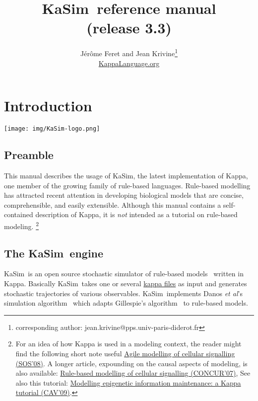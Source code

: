 \documentclass[11pt]{book}
\title{KaSim\version~reference manual\\ \small (release 3.3)}
\author{J\'er\^ome Feret and Jean Krivine\thanks{corresponding author: jean.krivine@pps.univ-paris-diderot.fr} \\\url{KappaLanguage.org}}
\date{}
\def\KaSim{\textsf{KaSim}}
\begin{document}
\maketitle


\tableofcontents
\listoftables

\chapter{Introduction}
\begin{center}\texttt{[image: img/KaSim-logo.png]}\end{center}

\section{Preamble}
This manual describes the usage of \KaSim, the latest implementation of Kappa, one member of the growing family of rule-based languages. Rule-based modelling has attracted recent attention in developing biological models that are concise, comprehensible, and easily extensible. 
Although this manual contains a self-contained description of Kappa, it is \emph{not} intended as a tutorial on rule-based modeling.%
%
\footnote{For an idea of how Kappa is used in a modeling context, the reader might find the following short note useful \href{http://www.pps.jussieu.fr/~danos/pdf/eov.pdf}{Agile modelling of cellular signalling (SOS'08)}. A longer article, expounding on the causal aspects of modeling, is also available: \href{http://www.pps.jussieu.fr/~danos/pdf/ka-fix.pdf}{Rule-based modelling of cellular signalling (CONCUR'07)}, See also this tutorial: \href{http://www.pps.jussieu.fr/~danos/pdf/mytdg.pdf}{Modelling epigenetic information maintenance: a Kappa tutorial (CAV'09)}. 
}%



\section{The \KaSim~engine}
\KaSim~is an open source stochastic simulator of rule-based models~\cite{DanLan04,Dan_etal07a,Fae_etal05} written in Kappa. Basically \KaSim~takes one or several \hyperref[chap:kappa]{kappa files} as input and generates stochastic trajectories of various observables. \KaSim~implements Danos \textit{et al}'s simulation algorithm~\cite{Dan_etal07b} which adapts Gillespie's algorithm~\cite{Gil76,Gil77} to rule-based models. 
\end{document}
